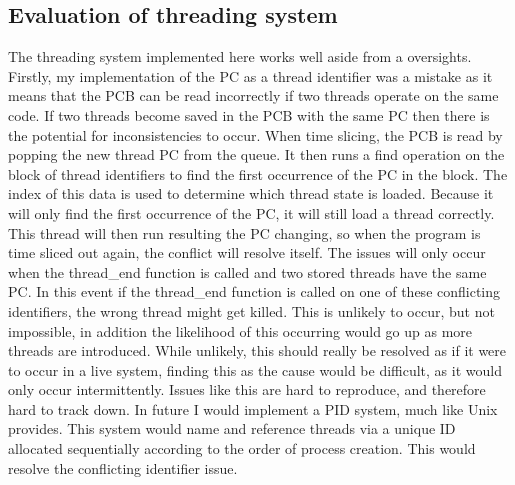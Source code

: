 \subsection{Evaluation of threading system}
\label{threadingeval}
The threading system implemented here works well aside from a oversights. Firstly, my implementation of the PC as a thread identifier was a mistake as it means that the PCB can be read incorrectly if two threads operate on the same code. If two threads become saved in the PCB with the same PC then there is the potential for inconsistencies to occur. When time slicing, the PCB is read by popping the new thread PC from the queue. It then runs a find operation on the block of thread identifiers to find the first occurrence of the PC in the block. The index of this data is used to determine which thread state is loaded. Because it will only find the first occurrence of the PC, it will still load a thread correctly. This thread will then run resulting the PC changing, so when the program is time sliced out again, the conflict will resolve itself. The issues will only occur when the thread\_end function is called and two stored threads have the same PC. In this event if the thread\_end function is called on one of these conflicting identifiers, the wrong thread might get killed. This is unlikely to occur, but not impossible, in addition the likelihood of this occurring would go up as more threads are introduced. While unlikely, this should really be resolved as if it were to occur in a live system, finding this as the cause would be difficult, as it would only occur intermittently. Issues like this are hard to reproduce, and therefore hard to track down. In future I would implement a PID system, much like Unix provides. This system would name and reference threads via a unique ID allocated sequentially according to the order of process creation. This would resolve the conflicting identifier issue.
















